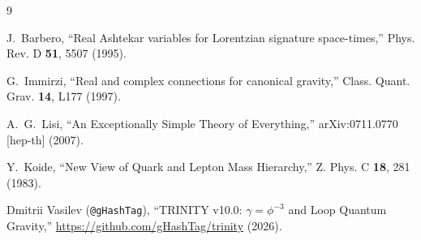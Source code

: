 \documentclass[12pt,a4paper]{article}
\begin{document}

\begin{thebibliography}{9}

J.~Barbero,
``Real Ashtekar variables for Lorentzian signature space-times,''
Phys. Rev. D \textbf{51}, 5507 (1995).

G.~Immirzi,
``Real and complex connections for canonical gravity,''
Class. Quant. Grav. \textbf{14}, L177 (1997).

A.~G.~Lisi,
``An Exceptionally Simple Theory of Everything,''
arXiv:0711.0770 [hep-th] (2007).

Y.~Koide,
``New View of Quark and Lepton Mass Hierarchy,''
Z. Phys. C \textbf{18}, 281 (1983).

Dmitrii Vasilev (\texttt{@gHashTag}),
``TRINITY v10.0: $\gamma = \phi^{-3}$ and Loop Quantum Gravity,''
\url{https://github.com/gHashTag/trinity} (2026).

\end{thebibliography}
\end{document}
